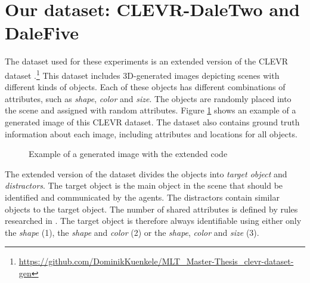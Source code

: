 \documentclass[11pt]{article}
\begin{document}
\section{Our dataset: CLEVR-DaleTwo and DaleFive}


The dataset used for these experiments is an extended version of the CLEVR dataset \citep{Johnson2016}.\footnote{%
  \href{https://github.com/DominikKuenkele/MLT\_Master-Thesis\_clevr-dataset-gen}{https://github.com/DominikKuenkele/MLT\_Master-Thesis\_clevr-dataset-gen}}
This dataset includes 3D-generated images depicting scenes with different kinds of objects. Each of these objects has different combinations of attributes, such as \emph{shape}, \emph{color} and \emph{size}. The objects are randomly placed into the scene and assigned with random attributes.
Figure \ref{fig:clevr-extended_example} shows an example of a generated image of this CLEVR dataset. The dataset also contains ground truth information about each image, including attributes and locations for all objects.

\begin{figure}[h]
  \centering
  \caption{Example of a generated image with the extended code} %
  \label{fig:clevr-extended_example}
\end{figure}

The extended version of the dataset divides the objects into \emph{target object} and \emph{distractors}. The target object is the main object in the scene that should be identified and communicated by the agents. The distractors contain similar objects to the target object. The number of shared attributes is defined by rules researched in \citet{Dale1995}. The target object is therefore always identifiable using either only the \emph{shape} (1), the \emph{shape} and \emph{color} (2) or the \emph{shape}, \emph{color} and \emph{size} (3).
\end{document}
